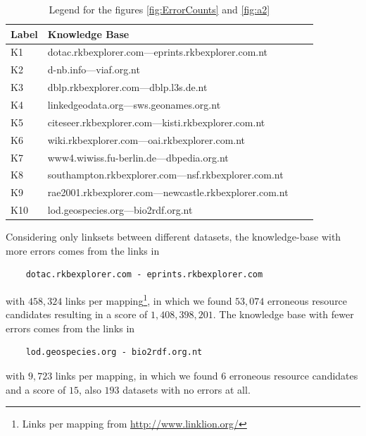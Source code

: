 \begin{table}[H]
	\small
	\centering
	\caption{Legend for the figures \ref{fig:ErrorCounts} and \ref{fig:a2}}
	\label{tab:legends}
	\begin{tabular}{@{}llll@{}}
		\toprule
		Label & Knowledge Base  \\ \midrule
		K1  & dotac.rkbexplorer.com---eprints.rkbexplorer.com.nt      \\
		K2  & d-nb.info---viaf.org.nt                                \\
		K3 & dblp.rkbexplorer.com---dblp.l3s.de.nt                    \\
		K4 & linkedgeodata.org---sws.geonames.org.nt                 \\
		K5 & citeseer.rkbexplorer.com---kisti.rkbexplorer.com.nt     \\
		K6 & wiki.rkbexplorer.com---oai.rkbexplorer.com.nt            \\
		K7 & www4.wiwiss.fu-berlin.de---dbpedia.org.nt                \\
		K8 & southampton.rkbexplorer.com---nsf.rkbexplorer.com.nt    \\
		K9 & rae2001.rkbexplorer.com---newcastle.rkbexplorer.com.nt  \\
		K10 & lod.geospecies.org---bio2rdf.org.nt                    \\ \bottomrule
	\end{tabular}
\end{table}
%

Considering only linksets between different datasets, the knowledge-base with more errors comes from the links in
\begin{verbatim}
    dotac.rkbexplorer.com - eprints.rkbexplorer.com
\end{verbatim}
with $458,324$ links per mapping\footnote{Links per mapping from \url{http://www.linklion.org/}}, in which we found $53,074$ erroneous resource candidates resulting in a score of $1,408,398,201$. The knowledge base with fewer errors comes from the links in
\begin{verbatim}
    lod.geospecies.org - bio2rdf.org.nt
\end{verbatim}
with $9,723$ links per mapping, in which we found $6$ erroneous resource candidates and a score of $15$, also $193$ datasets with no errors at all.

